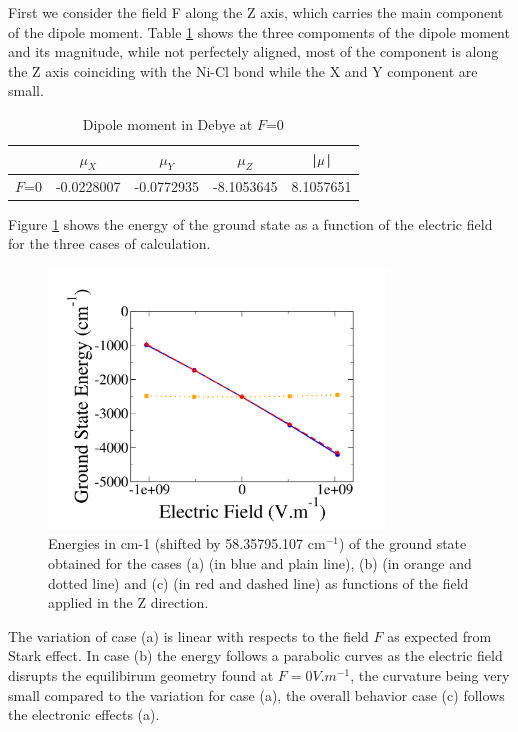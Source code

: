 \documentclass[10pt]{report}
\numberwithin{equation}{section}
\begin{document}
First we consider the field F along the Z axis, which carries the main component of the dipole moment.
Table \ref{tab:DipF0Z} shows the three compoments of the dipole moment and its magnitude, while not perfectely aligned, most of the component is along the Z axis coinciding with the Ni-Cl bond while the X and Y component are small.

\begin{table}[h]
    \centering
    \begin{tabular}{|c | c c c | c|}
        \hline
        & $\mu_X$ & $\mu_Y$ & $\mu_Z$ & |$\vb \mu$|\\
        \hline
        $F$=0 & -0.0228007 & -0.0772935 & -8.1053645 & 8.1057651   \\
        \hline
    \end{tabular}
    \caption{Dipole moment in Debye at $F$=0}
    \label{tab:DipF0Z}
\end{table}

Figure \ref{GSE_Z} shows the energy of the ground state as a function of the electric field for the three cases of calculation.

\begin{figure}[!h]
    \centering
    \includegraphics[width=0.8\textwidth]{Images/E_Z_grand.png}
    \caption{Energies in cm-1 (shifted by 58.35795.107 cm$^{-1}$) of the ground state obtained for the cases (a) (in blue and plain line), (b)
    (in orange and dotted line) and (c) (in red and dashed line) as functions of the field applied in the Z direction.}
    \label{GSE_Z}
\end{figure}

The variation of case (a) is linear with respects to the field $F$ as expected from Stark effect.
In case (b) the energy follows a parabolic curves as the electric field disrupts the equilibirum geometry found at $F=0V.m^{-1}$, the curvature being very small compared to the variation for case (a), the overall behavior case (c) follows the electronic effects (a).
\end{document}
